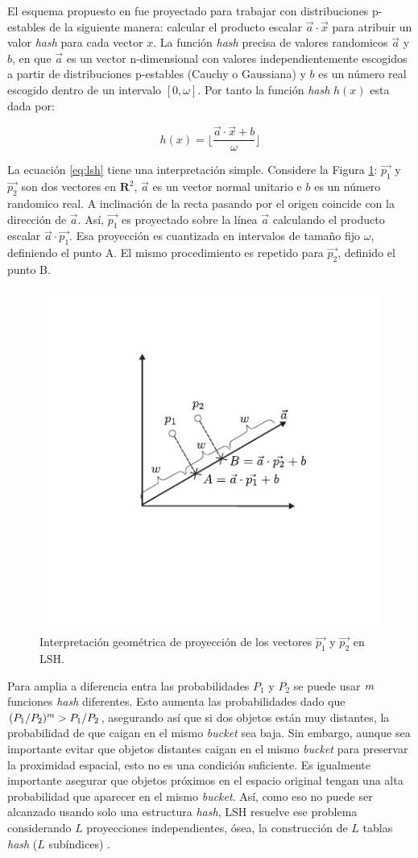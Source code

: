 El esquema propuesto en \cite{Datar2004} fue proyectado para trabajar con distribuciones p-estables de la siguiente manera: calcular el producto escalar $\vec{a} \cdot \vec{x}$ para atribuir un valor \textit{hash} para cada vector $x$. La función  \textit{hash} precisa de valores randomicos $\vec{a}$ y $b$, en que $\vec{a}$ es un vector n-dimensional con valores independientemente escogidos a partir de distribuciones p-estables (Cauchy o Gaussiana) y $b$ es un número real escogido dentro de un intervalo $[0,\omega]$. Por tanto la función \textit{hash} $h(x)$ esta dada por:


\begin{equation}\label{eq:lsh}
    h(x) = \lfloor\frac{\vec{a} \cdot \vec{x} + b}{ \omega }\rfloor
\end{equation}

La ecuación \ref{eq:lsh} tiene una interpretación simple. Considere la Figura \ref{fig:quantization}: $\vec{p_1}$ y $\vec{p_2}$ son dos vectores en $\mathbf{R}^2$, $\vec{a}$ es un vector normal unitario e $b$ es un número randomico real. A inclinación de la recta pasando por el origen coincide con la dirección de $\vec{a}$. Así, $\vec{p_1}$  es proyectado sobre la línea $\vec{a}$  calculando el producto escalar  $\vec{a} \cdot \vec{p_1}$. Esa proyección es cuantizada en intervalos de tamaño fijo  $\omega$, definiendo el punto A. El mismo procedimiento es repetido para $\vec{p_2}$, definido el punto B.

\begin{figure}[htp]\centering
\includegraphics[width=0.3\columnwidth]{images/lsh_projection.pdf}
\caption{Interpretación geométrica de proyección de los  vectores $\vec{p_1}$ y $\vec{p_2}$ en LSH.}
\label{fig:quantization}
\end{figure}

Para amplia a diferencia entra las probabilidades $P_1$ y $P_2$ se puede usar $m$ funciones \textit{hash} diferentes. Esto aumenta las probabilidades dado que \mbox{$(P_1/P_2)^m > P_1/P_2$}, asegurando así que si dos objetos están muy distantes, la probabilidad de que caigan en el mismo \textit{bucket} sea baja. Sin embargo, aunque sea importante evitar que objetos distantes caigan en el mismo \textit{bucket} para preservar la proximidad espacial, esto no es una condición suficiente. Es igualmente importante asegurar que objetos próximos en el espacio original tengan una alta probabilidad que aparecer en el mismo \textit{bucket}. Así, como eso no puede ser alcanzado usando solo una estructura \textit{hash}, LSH resuelve ese problema considerando $L$ proyecciones independientes, ósea, la construcción de $L$ tablas \textit{hash} ($L$ subíndices) \cite{lshtutorial,taoLSBLSH}.

